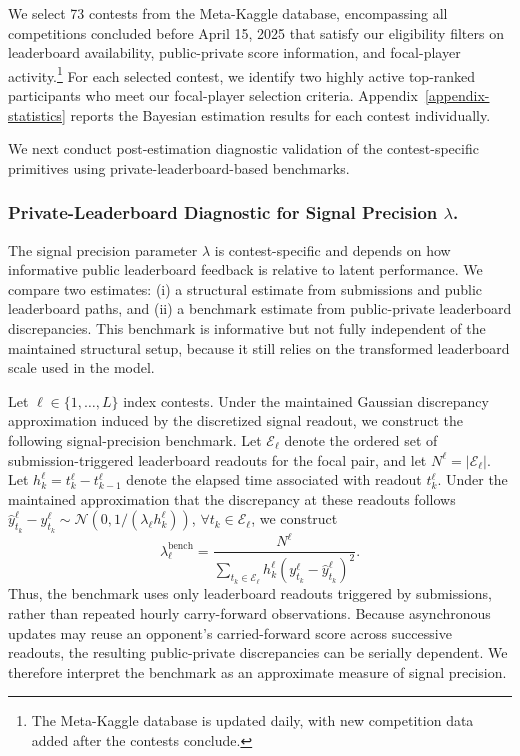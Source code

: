 \documentclass[mnsc]{informs3}
\begin{document}
We select 73 contests from the Meta-Kaggle database, encompassing all competitions concluded before April 15, 2025 that satisfy our eligibility filters on leaderboard availability, public-private score information, and focal-player activity.\footnote{
The Meta-Kaggle database is updated daily, with new competition data added after the contests conclude.
}
For each selected contest, we identify two highly active top-ranked participants who meet our focal-player selection criteria.
Appendix~\ref{appendix-statistics} reports the Bayesian estimation results for each contest individually.

We next conduct post-estimation diagnostic validation of the contest-specific primitives using private-leaderboard-based benchmarks.

\subsubsection{Private-Leaderboard Diagnostic for Signal Precision $\lambda$.}
The signal precision parameter $\lambda$ is contest-specific and depends on how informative public leaderboard feedback is relative to latent performance.
We compare two estimates: (i) a structural estimate from submissions and public leaderboard paths, and (ii) a benchmark estimate from public-private leaderboard discrepancies.
This benchmark is informative but not fully independent of the maintained structural setup, because it still relies on the transformed leaderboard scale used in the model.

Let $\ell\in\{1,\ldots,L\}$ index contests.
Under the maintained Gaussian discrepancy approximation induced by the discretized signal readout, we construct the following signal-precision benchmark.
Let $\mathcal E_\ell$ denote the ordered set of submission-triggered leaderboard readouts for the focal pair, and let $N^\ell=|\mathcal E_\ell|$.
Let $h_k^\ell=t_k^\ell-t_{k-1}^\ell$ denote the elapsed time associated with readout $t_k^\ell$.
Under the maintained approximation that the discrepancy at these readouts follows $\hat{y}_{t_k}^\ell-y_{t_k}^\ell\sim\mathcal N(0,1/(\lambda_\ell h_k^\ell))$, $\forall t_k\in\mathcal E_\ell$, we construct
\begin{equation*}
\lambda^{\text{bench}}_\ell =
\frac{N^\ell}
{\sum_{t_k\in\mathcal E_\ell}
h_k^\ell (y_{t_k}^\ell - \hat{y}_{t_k}^\ell)^2}.
\end{equation*}
Thus, the benchmark uses only leaderboard readouts triggered by submissions, rather than repeated hourly carry-forward observations.
Because asynchronous updates may reuse an opponent’s carried-forward score across successive readouts, the resulting public-private discrepancies can be serially dependent. We therefore interpret the benchmark as an approximate measure of signal precision.
\end{document}

